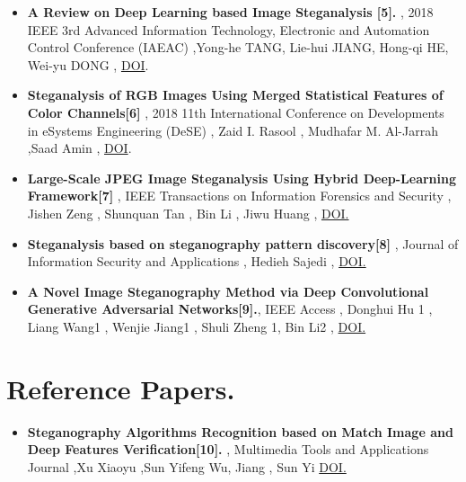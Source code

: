 \documentclass{beamer} %
\theoremstyle{definition} %
\begin{document}
\begin{itemize}
	\item {\textbf{A Review on Deep Learning based Image Steganalysis [5].} ,  2018 IEEE 3rd Advanced Information Technology, Electronic and Automation Control Conference (IAEAC) ,Yong-he TANG, Lie-hui JIANG, Hong-qi HE, Wei-yu DONG , \href{http://doi.org/10.1109/IAEAC.2018.8577655} {DOI}.}
\end{itemize}
\begin{itemize}
	\item {\textbf{Steganalysis of RGB Images Using Merged Statistical Features of Color Channels[6]} , 2018 11th International Conference on Developments in eSystems Engineering (DeSE) , Zaid I. Rasool , Mudhafar M. Al-Jarrah ,Saad Amin , \href{https://doi.org/10.1109/DeSE.2018.00048}{DOI}.}
\end{itemize}
\begin{itemize}
	\item {\textbf{Large-Scale JPEG Image Steganalysis Using
			Hybrid Deep-Learning Framework[7]} ,  IEEE Transactions on Information Forensics and Security , Jishen Zeng  , Shunquan Tan  , Bin Li , Jiwu Huang , \href{https://doi.org/10.1109/TIFS.2017.2779446}{DOI.} }
\end{itemize}
\begin{itemize}
    \item {\textbf{Steganalysis based on steganography pattern
    		discovery[8]} , Journal of Information Security and Applications , Hedieh Sajedi , \href{https://doi.org/10.1016/j.jisa.2016.04.001}{DOI.} }
\end{itemize}
\begin{itemize}
	\item{\textbf{A Novel Image Steganography Method via Deep Convolutional Generative Adversarial Networks[9].}, IEEE Access , Donghui Hu 1 , Liang Wang1 , Wenjie Jiang1 , Shuli Zheng 1,  Bin Li2 , \href{https://doi.org/10.1109/ACCESS.2018.2852771}{DOI.}}
\end{itemize}
\section {Reference Papers.}
\begin{itemize}
     \item {\textbf{Steganography Algorithms Recognition based on Match
     Image and Deep Features Verification[10].} , Multimedia Tools and Applications Journal ,Xu Xiaoyu ,Sun Yifeng Wu, Jiang , Sun Yi \href{https://doi.org/10.1007/s11042-018-6010-9}{DOI.}}
  
\end{itemize}
\end{document}
